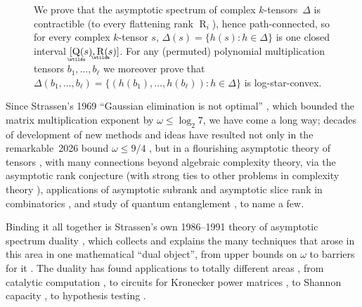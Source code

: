 \documentclass[11pt,letterpaper]{article}
\DeclareMathOperator{\asympsubrank}{\underaccent{\wtilde}{Q}}
\DeclareMathOperator{\asymprank}{\underaccent{\wtilde}{R}}
\DeclareMathOperator{\tensorrank}{R}
\begin{document}
\begin{figure}[b]
\setlength{\abovecaptionskip}{4pt}
\caption{We prove that the asymptotic spectrum of complex $k$-tensors~$\Delta$ is contractible (to every flattening rank $\tensorrank_i$), hence path-connected, so for every complex $k$-tensor $s$, \(\Delta(s)=\{h(s):h\in\Delta\}\) is one closed interval $[\asympsubrank(s), \asymprank(s)]$. For any (permuted) polynomial multiplication tensors  $b_1,\ldots,  b_\ell$ we moreover prove that \(\Delta(b_1,\ldots, b_\ell)=\{(h(b_1),\ldots, h(b_\ell)):h\in\Delta\}\) is log-star-convex.}\label{fig:intro-connectedness}
\end{figure}

Since Strassen's 1969 ``Gaussian elimination is not optimal'' \cite{strassen1969gaussian}, which bounded the matrix multiplication exponent by $\omega \leq \log_2 7$, we have come a long way; decades of development of new methods and ideas have resulted not only in the remarkable~2026 bound $\omega \leq 9/4$ \cite{OAI:Matrix-Multiplication-Nine-Fourths-October-2-2026}, but in a flourishing asymptotic theory of tensors \cite{burgisser1997algebraic, blaser2013fast, wigderson2022asymptotic}, with many connections beyond algebraic complexity theory, via the asymptotic rank conjecture \cite{MR1341854,MR4204580,kaski2024universalsequencetensorsasymptotic,alman2026asymptoticrankspeeduptheorems} (with strong ties to other problems in complexity theory \cite{10.1145/3618260.3649656, 10.1145/3618260.3649620,björklund2024chromaticnumber19999ntime,MR5048041}), applications of asymptotic subrank and asymptotic slice rank in combinatorics \cite{MR3583358,tao,MR3631613,naslund_sawin_2017}, and study of quantum entanglement \cite{MR4495838,vrana2015transformation}, to name a few. 

Binding it all together is Strassen's own 1986--1991 theory of asymptotic spectrum duality \cite{DBLP:conf/focs/Strassen86,MR882307,strassen1988asymptotic,strassen1991degeneration}, which collects and explains the many techniques that arose in this area in one mathematical ``dual object'', from upper bounds on $\omega$ to barriers for it \cite{alman2018limits,v017a002,MR4870821,amanov2026multiplyingmatricespolynomialsexposition,shpilka2026exposition}. The duality has found applications to totally different areas \cite{wigderson2022asymptotic}, from catalytic computation \cite{MR4399732}, to circuits for Kronecker power matrices \cite{MR5048041}, to Shannon capacity \cite{MR4039606,MR4357434,MR4231964,deboer2024asymptoticspectrumdistancegraph}, to hypothesis testing \cite{MR4286265,MR4395416}.
\end{document}
